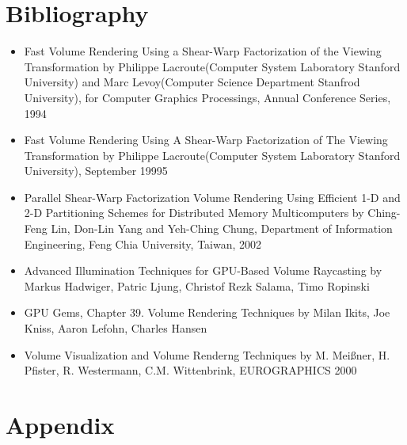 \documentclass[english]{article}
\begin{document}
\section{Bibliography}
\begin{itemize}
  \item Fast Volume Rendering Using a Shear-Warp Factorization of the Viewing Transformation by Philippe Lacroute(Computer System Laboratory Stanford University) and Marc Levoy(Computer Science Department Stanfrod University), for Computer Graphics Processings, Annual Conference Series, 1994
  \item Fast Volume Rendering Using A Shear-Warp Factorization of The Viewing Transformation by Philippe Lacroute(Computer System Laboratory Stanford University), September 19995
  \item Parallel Shear-Warp Factorization Volume Rendering Using Efficient 1-D and 2-D Partitioning Schemes for Distributed Memory Multicomputers by Ching-Feng Lin, Don-Lin Yang and Yeh-Ching Chung, Department of Information Engineering, Feng Chia University, Taiwan, 2002
  \item Advanced Illumination Techniques for GPU-Based Volume Raycasting by Markus Hadwiger, Patric Ljung, Christof Rezk Salama, Timo Ropinski
  \item GPU Gems, Chapter 39. Volume Rendering Techniques by Milan Ikits, Joe Kniss, Aaron Lefohn, Charles Hansen
  \item Volume Visualization and Volume Renderng Techniques by M. Mei{\ss}ner, H. Pfister, R. Westermann, C.M. Wittenbrink, EUROGRAPHICS 2000
\end{itemize}
\section{Appendix}

\end{document}
